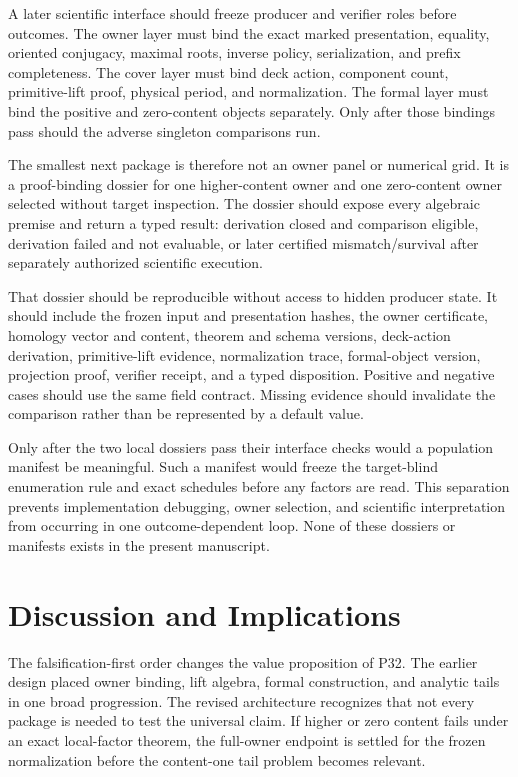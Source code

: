 \documentclass[11pt]{article}
\begin{document}
A later scientific interface should freeze producer and verifier roles
before outcomes. The owner layer must bind the exact marked
presentation, equality, oriented conjugacy, maximal roots, inverse
policy, serialization, and prefix completeness. The cover layer must
bind deck action, component count, primitive-lift proof, physical
period, and normalization. The formal layer must bind the positive and
zero-content objects separately. Only after those bindings pass should
the adverse singleton comparisons run.

The smallest next package is therefore not an owner panel or numerical
grid. It is a proof-binding dossier for one higher-content owner and one
zero-content owner selected without target inspection. The dossier
should expose every algebraic premise and return a typed result:
derivation closed and comparison eligible, derivation failed and not
evaluable, or later certified mismatch/survival after separately
authorized scientific execution.

That dossier should be reproducible without access to hidden producer
state. It should include the frozen input and presentation hashes, the
owner certificate, homology vector and content, theorem and schema
versions, deck-action derivation, primitive-lift evidence, normalization
trace, formal-object version, projection proof, verifier receipt, and a
typed disposition. Positive and negative cases should use the same
field contract. Missing evidence should invalidate the comparison
rather than be represented by a default value.

Only after the two local dossiers pass their interface checks would a
population manifest be meaningful. Such a manifest would freeze the
target-blind enumeration rule and exact schedules before any factors are
read. This separation prevents implementation debugging, owner
selection, and scientific interpretation from occurring in one
outcome-dependent loop. None of these dossiers or manifests exists in
the present manuscript.

\hypertarget{7-discussion-and-implications}{%
\section{Discussion and
Implications}\label{7-discussion-and-implications}}

The falsification-first order changes the value proposition of P32. The
earlier design placed owner binding, lift algebra, formal construction,
and analytic tails in one broad progression. The revised architecture recognizes that
not every package is needed to test the universal claim. If higher or
zero content fails under an exact local-factor theorem, the full-owner
endpoint is settled for the frozen normalization before the content-one
tail problem becomes relevant.
\end{document}
